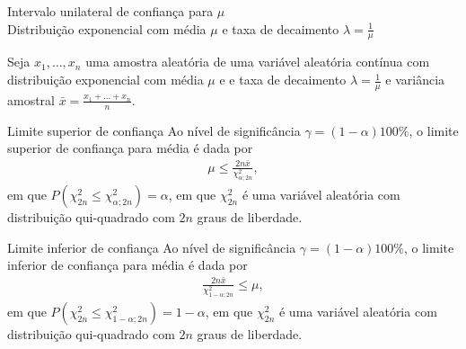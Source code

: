 \documentclass[8pt]{beamer}
\begin{document}
\begin{frame}{Intervalo unilateral de confiança para $\mu$\\ Distribuição exponencial com média $\mu$ e taxa de decaimento $\lambda=\frac{1}{\mu}$}

\small

Seja $x_1, \dots, x_n$ uma amostra aleatória de uma variável aleatória contínua com distribuição exponencial com média $\mu$ e e taxa de decaimento $\lambda=\frac{1}{\mu}$ e variância amostral $\bar{x} = \frac{x_1 + \dots + x_n}{n}$. 

\begin{block}{Limite superior de confiança}
	Ao nível de significância $\gamma=(1-\alpha)100\%$, o limite superior de confiança para média é dada por
	\begin{align*}
	\mu \leq \frac{2n \bar{x}}{\chi^2_{\alpha; 2n}},
	\end{align*}
	em que $P\left( \chi^2_{2n} \leq \chi^2_{\alpha; 2n} \right) = \alpha$, em que $\chi^2_{2n}$ é uma variável aleatória com distribuição qui-quadrado com $2n$ graus de liberdade.
	
\end{block}

\begin{block}{Limite inferior de confiança}
	Ao nível de significância $\gamma=(1-\alpha)100\%$, o limite inferior de confiança para média é dada por
	\begin{align*}
	\frac{2 n \bar{x}}{\chi^{2}_{1-\alpha;2n}} \leq \mu,
	\end{align*}
	em que $P\left( \chi^2_{2n} \leq \chi^{2}_{1-\alpha;2n} \right) = 1-\alpha$, em que $\chi^2_{2n}$ é uma variável aleatória com distribuição qui-quadrado com $2n$ graus de liberdade.
\end{block}

\normalsize

\end{frame}
\end{document}
